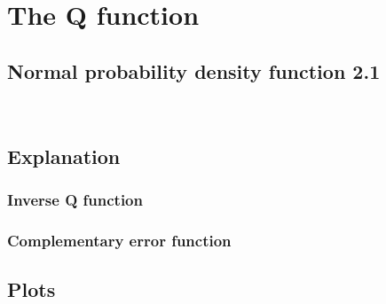 \section{The Q function}

\subsection{Normal probability density function 2.1}
\



\subsection{Explanation}



\subsubsection{Inverse Q function}



\subsubsection{Complementary error function}



\subsection{Plots}
